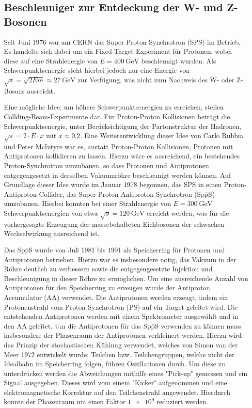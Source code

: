 \subsection{Beschleuniger zur Entdeckung der W- und Z-Bosonen}
Seit Juni 1976 war am CERN das Super Proton Synchrotron (SPS) im Betrieb.
Es handelte sich dabei um ein Fixed-Target Experiment für Protonen, wobei diese auf eine Strahlenergie von $E = \SI{400}{\giga\electronvolt}$ beschleunigt wurden.
Als Schwerpunktsenergie steht hierbei jedoch nur eine Energie von $\sqrt{s} = \sqrt{2 E m} \approx \SI{27}{\giga\electronvolt}$ zur Verfügung, was nicht zum Nachweis des W- oder Z-Bosons ausreicht.

Eine mögliche Idee, um höhere Schwerpunktsenergien zu erreichen, stellen Collding-Beam-Experimente dar.
Für Proton-Proton Kollisionen beträgt die Schwerpunktsenergie, unter Berücksichtigung der Partonstruktur der Hadronen, $\sqrt{s} = 2 \cdot E \cdot x$ mit $x \approx \num{0.2}$.
Eine Weiterentwicklung dieser Idee von Carlo Rubbia und Peter McIntyre war es, anstatt Proton-Proton Kollisionen, Protonen mit Antiprotonen kollidieren zu lassen.
Hierzu wäre es ausreichend, ein bestehendes Proton-Synchrotron umzubauen, so dass Protonen und Antiprotonen entgegengesetzt in derselben Vakuumröhre beschleunigt werden können.
Auf Grundlage dieser Idee wurde im Januar 1978 begonnen, das SPS in einen Proton-Antiproton-Collider, das Super Proton Antiproton Synchrotron (Sp$\overline{\text{p}}$S) umzubauen.
Hierbei konnten bei einer Strahlenergie von $E = \SI{300}{\giga\electronvolt}$ Schwerpunktsenergien von etwa $\sqrt{s} = \SI{120}{\giga\electronvolt}$ erreicht werden, was für die vorhergesagte Erzeugung der massebehafteten Eichbosonen der schwachen Wechselwirkung ausreichend ist.

Das Sp$\overline{\text{p}}$S wurde von Juli 1981 bis 1991 als Speicherring für Protonen und Antiprotonen betrieben.
Hierzu war es insbesondere nötig, das Vakuum in der Röhre deutlich zu verbessern sowie die entgegengesetzte Injektion und Beschleunigung in dieser Röhre zu ermöglichen.
Um eine ausreichende Anzahl von Antiprotonen für den Speicherring zu erzeugen wurde der Antiproton Accumulator (AA) verwendet.
Die Antiprotonen werden erzeugt, indem ein Protonenstrahl vom Proton Synchrotron (PS) auf ein Target geleitet wird.
Die entstehenden Antiprotonen werden mit einem Spektrometer ausgewählt und in den AA geleitet.
Um die Antiprotonen für das Sp$\overline{\text{p}}$S verwenden zu können muss insbesondere der Phasenraum der Antiprotonen verkleinert werden.
Hierzu wird das Prinzip der stochastischen Kühlung verwendet, welches von Simon van der Meer 1972 entwickelt wurde:
Teilchen bzw. Teilchengruppen, welche nicht der Idealbahn im Speicherring folgen, führen Oszillationen durch.
Um diese zu unterdrücken werden die Abweichungen mithilfe eines "Pick-up" gemessen und ein Signal ausgegeben.
Dieses wird vom einem "Kicker" aufgenommen und eine elektromagnetische Korrektur auf den Teilchenstrahl angewendet.
Hierdurch konnte der Phasenraum um einen Faktor $\num{1e9}$ reduziert werden.


